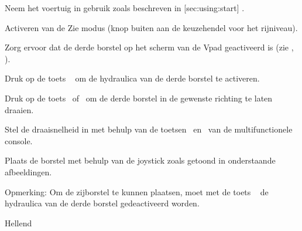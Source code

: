 \stopsection






\startsection [title={Met de derde borstel werken (optie)},
reference={sec:using:frontBrush},
]

\startSteps
\item Neem het voertuig in gebruik zoals beschreven in  [sec:using:start] .
\item Activeren van de  Zie modus (knop buiten aan de keuzehendel voor het rijniveau).
\stopSteps


\startSteps [continue]
\item Zorg ervoor dat de derde borstel op het scherm van de Vpad geactiveerd is (zie  , ).
\item Druk op de toets ~ om de hydraulica van de derde borstel te activeren.
\item Druk op de toets~ of~ om de derde borstel in de gewenste richting te laten draaien.

\item Stel de draaisnelheid in met behulp van de toetsen~ en~ van de multifunctionele console.

\item Plaats de borstel met behulp van de joystick zoals getoond in onderstaande afbeeldingen.

\stopSteps

{\md Opmerking:} {\lt Om de zijborstel te kunnen plaatsen, moet met de toets ~ de hydraulica van de derde borstel gedeactiveerd worden.}
\vfill

\start
\setupcombinations [width=\textwidth]

{
{}{Hellend}
\stopcombination}
\stop



\stopsection



